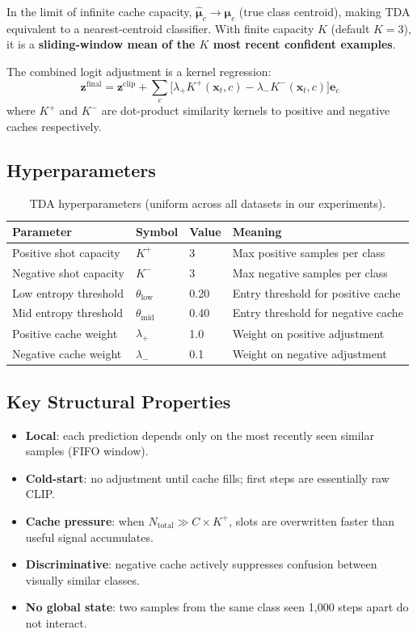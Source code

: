 \documentclass[12pt,a4paper]{article}
\newcommand{\bx}{\mathbf{x}}
\newcommand{\bmu}{\boldsymbol{\mu}}
\newcommand{\1}{\mathbf{1}}
\begin{document}
In the limit of infinite cache capacity, $\hat{\bmu}_c \to \bmu_c$ (true class centroid), making TDA equivalent to a nearest-centroid classifier.
With finite capacity $K$ (default $K=3$), it is a \textbf{sliding-window mean of the $K$ most recent confident examples}.

The combined logit adjustment is a kernel regression:
\begin{equation}
  \mathbf{z}^{\text{final}} = \mathbf{z}^{\text{clip}} + \sum_{c} \bigl[\lambda_+ K^+(\bx_t, c) - \lambda_- K^-(\bx_t, c)\bigr] \mathbf{e}_c
  \label{eq:tda_combined}
\end{equation}
where $K^+$ and $K^-$ are dot-product similarity kernels to positive and negative caches respectively.

\subsection{Hyperparameters}

\begin{table}[H]
\centering
\caption{TDA hyperparameters (uniform across all datasets in our experiments).}
\label{tab:tda_hyperparams}
\begin{tabular}{@{}llll@{}}
\toprule
Parameter & Symbol & Value & Meaning \\
\midrule
Positive shot capacity & $K^+$ & 3 & Max positive samples per class \\
Negative shot capacity & $K^-$ & 3 & Max negative samples per class \\
Low entropy threshold  & $\theta_{\text{low}}$ & 0.20 & Entry threshold for positive cache \\
Mid entropy threshold  & $\theta_{\text{mid}}$ & 0.40 & Entry threshold for negative cache \\
Positive cache weight  & $\lambda_+$ & 1.0 & Weight on positive adjustment \\
Negative cache weight  & $\lambda_-$ & 0.1 & Weight on negative adjustment \\
\bottomrule
\end{tabular}
\end{table}

\subsection{Key Structural Properties}

\begin{itemize}
  \item \textbf{Local}: each prediction depends only on the most recently seen similar samples (FIFO window).
  \item \textbf{Cold-start}: no adjustment until cache fills; first steps are essentially raw CLIP.
  \item \textbf{Cache pressure}: when $N_{\text{total}} \gg C \times K^+$, slots are overwritten faster than useful signal accumulates.
  \item \textbf{Discriminative}: negative cache actively suppresses confusion between visually similar classes.
  \item \textbf{No global state}: two samples from the same class seen 1,000 steps apart do not interact.
\end{itemize}
\end{document}
